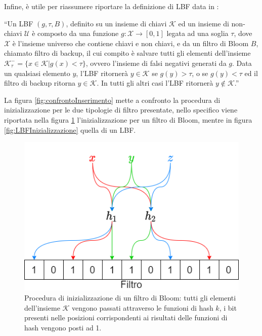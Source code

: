 \documentclass[../../main.tex]{subfiles}
\begin{document}
    Infine, è utile per riassumere riportare la definizione di LBF data in \cite{10.5555/3326943.3326986}: 

    ``Un LBF $(g, \tau, B)$, definito su un insieme di chiavi $\mathcal{K}$ ed un insieme di non-chiavi $\mathcal{U}$ è composto da una funzione $g : \mathcal{X} \rightarrow [0,1]$ legata ad una soglia $\tau$, dove $\mathcal{X}$ è l'insieme universo che contiene chiavi e non chiavi, e da un filtro di Bloom $B$, chiamato filtro di backup, il cui compito è salvare tutti gli elementi dell'insieme $\mathcal{K}_{\tau}^- = \{x \in \mathcal{K} | g(x) < \tau\}$, ovvero l'insieme di falsi negativi generati da $g$. Data un qualsiasi elemento $y$, l'LBF ritornerà $y \in \mathcal{K}$ se $g(y) > \tau$, o se $g(y) < \tau$ ed il filtro di backup ritorna $y \in \mathcal{K}$. In tutti gli altri casi l'LBF ritornerà $y \notin \mathcal{K}$.''

    La figura \ref{fig:confrontoInserimento} mette a confronto la procedura di inizializzazione per le due tipologie di filtro presentate, nello specifico viene riportata nella figura \ref{fig:BFInizializzazione} l'inizializzazione per un filtro di Bloom, mentre in figura \ref{fig:LBFInizializzazione} quella di un LBF.

    \begin{figure}[H]
        \centering
        \includegraphics[width=\textwidth]{immagini/5_1/BFInizializzazione.png}
        \caption{Procedura di inizializzazione di un filtro di Bloom: tutti gli elementi dell'insieme $\mathcal{K}$ vengono passati attraverso le funzioni di hash $k$, i bit presenti nelle posizioni corrispondenti ai risultati delle funzioni di hash vengono posti ad 1.}
        \label{fig:BFInizializzazione}
    \end{figure}
\end{document}
